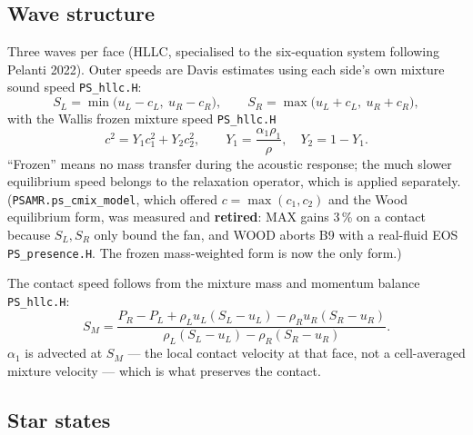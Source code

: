 \documentclass[11pt,a4paper]{article}
\newcommand{\code}[1]{\texttt{\small #1}}
\newcommand{\src}[1]{{\color{gray}\code{#1}}}
\begin{document}
\subsection{Wave structure}

Three waves per face (HLLC, specialised to the six-equation system following
Pelanti 2022).  Outer speeds are Davis estimates using each side's own mixture
sound speed \src{PS\_hllc.H}:
\begin{equation}
  S_L = \min\!\bigl(u_L-c_L,\ u_R-c_R\bigr),
  \qquad
  S_R = \max\!\bigl(u_L+c_L,\ u_R+c_R\bigr),
\end{equation}
with the Wallis frozen mixture speed \src{PS\_hllc.H}
\begin{equation}
  c^2 = Y_1c_1^2 + Y_2c_2^2,
  \qquad
  Y_1 = \frac{\alpha_1\rho_1}{\rho},\quad Y_2 = 1-Y_1 .
  \label{eq:cmix}
\end{equation}
``Frozen'' means no mass transfer during the acoustic response; the much
slower equilibrium speed belongs to the relaxation operator, which is applied
separately.  (\code{PSAMR.ps\_cmix\_model}, which offered $c=\max(c_1,c_2)$
and the Wood equilibrium form, was measured and \textbf{retired}: MAX gains 3\,\% on a contact because $S_L,S_R$ only bound the
fan, and WOOD aborts B9 with a real-fluid EOS
\src{PS\_presence.H}.  The frozen mass-weighted form is now the
only form.)

The contact speed follows from the mixture mass and momentum balance
\src{PS\_hllc.H}:
\begin{equation}
  S_M = \frac{P_R-P_L + \rho_Lu_L(S_L-u_L) - \rho_Ru_R(S_R-u_R)}
             {\rho_L(S_L-u_L) - \rho_R(S_R-u_R)} .
\end{equation}
$\alpha_1$ is advected at $S_M$ --- the local contact velocity at that face,
not a cell-averaged mixture velocity --- which is what preserves the contact.

\subsection{Star states}
\label{sec:star}
\end{document}
